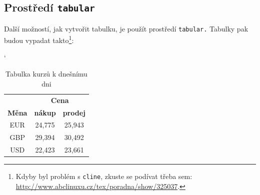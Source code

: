 \documentclass[11pt,a4paper]{article}
\begin{document}
\subsection{Prostředí \texttt{tabular}}

Další možností, jak vytvořit tabulku, je použít prostředí \texttt{tabular.} Tabulky pak budou vypadat takto\footnote{Kdyby byl problém s \texttt{cline}, zkuste se podívat třeba sem: \normalfont \url{http://www.abclinuxu.cz/tex/poradna/show/325037}.}: \\
\begin{table}[h]
\begin{center}
\catcode`
    \begin{tabular}{|c|c|c|}
    \hline
     & \multicolumn{2}{c}{\textbf{Cena}} \vline \\ \cline{2-3}
   \textbf{Měna} & \textbf{nákup} & \textbf{prodej} \\ \hline
    EUR & 24,775 & 25,943 \\
    GBP & 29,394 & 30,492 \\
    USD & 22,423 & 23,661 \\ \hline
    \end{tabular}
    \caption{Tabulka kurzů k dnešnímu dni}
    \label{tab_1}
\end{center}
\end{table}
\end{document}
